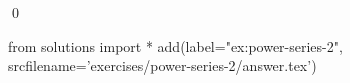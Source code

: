 \begin{ex}
  \label{ex:power-series-2}
  
  \qed
\end{ex}
\begin{python0}
from solutions import *
add(label="ex:power-series-2",
    srcfilename='exercises/power-series-2/answer.tex') 
\end{python0}                              
